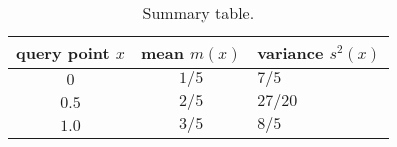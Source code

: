 \documentclass[11pt, DINA4, fleqn]{amsart}
\begin{document}

\renewcommand{\arraystretch}{1.40}

\begin{center}

	\begin{table}

	\begin{tabularx}{8.0cm}{ccX}
		\hline
		query point $x$ & mean $m(x)$ & variance $s^2(x)$\\
		\hline
		$0$ & $1/5$ & $7/5$ \\  
		$0.5$ & $2/5$ & $27/20$ \\
		$1.0$ & $3/5$ & $8/5$ \\ 
		\hline  
	\end{tabularx}

	 \caption{Summary table.\label{tbl:benchmarkTable}}

	\end{table}

\end{center}
\end{document}
